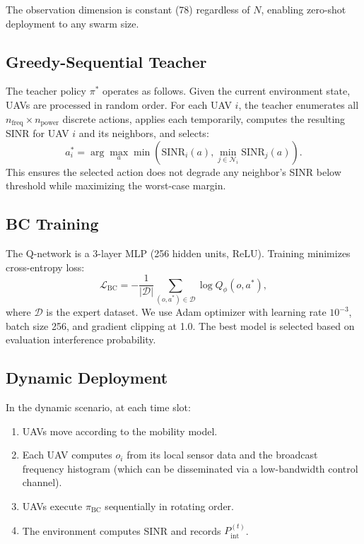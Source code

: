 \documentclass[journal]{IEEEtran}
\begin{document}
The observation dimension is constant (78) regardless of $N$, enabling zero-shot deployment to any swarm size.

\subsection{Greedy-Sequential Teacher}

The teacher policy $\pi^*$ operates as follows. Given the current environment state, UAVs are processed in random order. For each UAV $i$, the teacher enumerates all $n_{\text{freq}} \times n_{\text{power}}$ discrete actions, applies each temporarily, computes the resulting SINR for UAV $i$ and its neighbors, and selects:
\begin{equation}
a_i^* = \arg\max_{a} \min\!\left(\text{SINR}_i(a), \min_{j \in \mathcal{N}_i} \text{SINR}_j(a)\right).
\end{equation}
This ensures the selected action does not degrade any neighbor's SINR below threshold while maximizing the worst-case margin.

\subsection{BC Training}

The Q-network is a 3-layer MLP (256 hidden units, ReLU). Training minimizes cross-entropy loss:
\begin{equation}
\mathcal{L}_{\text{BC}} = -\frac{1}{|\mathcal{D}|}\sum_{(o, a^*) \in \mathcal{D}} \log Q_\phi(o, a^*),
\end{equation}
where $\mathcal{D}$ is the expert dataset. We use Adam optimizer with learning rate $10^{-3}$, batch size 256, and gradient clipping at 1.0. The best model is selected based on evaluation interference probability.

\subsection{Dynamic Deployment}

In the dynamic scenario, at each time slot:
\begin{enumerate}
    \item UAVs move according to the mobility model.
    \item Each UAV computes $o_i$ from its local sensor data and the broadcast frequency histogram (which can be disseminated via a low-bandwidth control channel).
    \item UAVs execute $\pi_{\text{BC}}$ sequentially in rotating order.
    \item The environment computes SINR and records $P_{\text{int}}^{(t)}$.
\end{enumerate}
\end{document}
